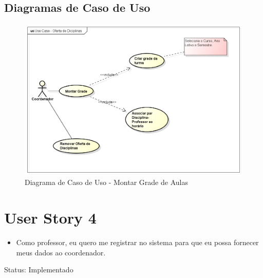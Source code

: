 \documentclass{abnt}
\begin{document}
		\subsection{Diagramas de Caso de Uso}
			\begin{figure}[h]
				\begin{center}
				 \includegraphics[width=450px]{casoUsoOfertaDisciplinas}
				 \caption{Diagrama de Caso de Uso - Montar Grade de Aulas}
				\end{center}
			\end{figure}
			

		


		
			
	\clearpage
		\section{User Story 4}
	
			\begin{itemize}
				\item Como professor, eu quero me registrar no sistema para que eu possa fornecer meus dados ao coordenador.
			\end{itemize}
			
			Status: Implementado
			
\end{document}
